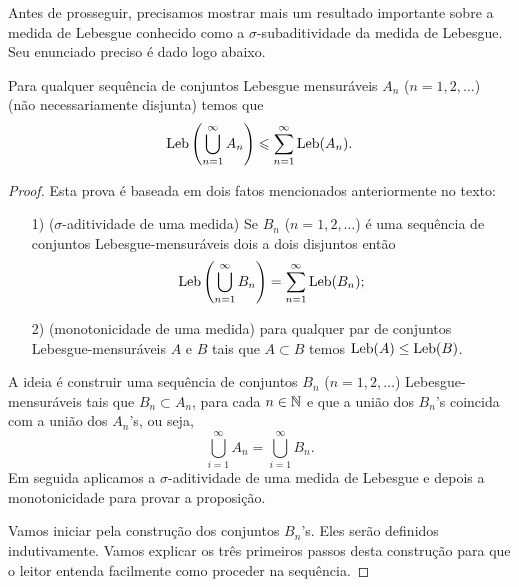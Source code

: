         Antes de prosseguir, precisamos mostrar mais um resultado
        importante sobre a medida de Lebesgue conhecido
        como a $\sigma$-subaditividade da medida de Lebesgue.
        Seu enunciado preciso é dado logo abaixo.
        \begin{proposicao}
        \label{prop-sub-sigma-aditividade-medida}
            Para qualquer sequência de conjuntos Lebesgue mensuráveis $A_n$ ($n=1,2,\ldots$)
            (não necessariamente disjunta) temos que
            \[
                \mathrm{Leb}\left( \bigcup_{n=1}^{\infty} A_n\right)
                \leqslant
                \sum_{n=1}^{\infty} \mathrm{Leb}(A_n).
            \]
        \end{proposicao}
        \begin{proof}
            Esta prova é baseada em dois fatos mencionados anteriormente no texto:
            \begin{itemize}
                \item[1)] ($\sigma$-aditividade de uma medida) 
                Se $B_n$ ($n=1,2,\ldots$) é uma sequência de conjuntos 
                Lebesgue-mensuráveis dois a dois disjuntos então 
                \[
                    \mathrm{Leb}\left( \bigcup_{n=1}^{\infty} B_n\right)
                    =
                    \sum_{n=1}^{\infty} \mathrm{Leb}(B_n);
                \]
                
                \item[2)] (monotonicidade de uma medida) para qualquer 
                par de conjuntos Lebesgue-mensuráveis $A$ e $B$ 
                tais que $A\subset B$ temos $\mathrm{Leb}(A)\leq \mathrm{Leb}(B)$. 
            \end{itemize}
            A ideia é construir uma sequência de conjuntos $B_n$ ($n=1,2,\ldots$) 
            Lebesgue-mensuráveis tais que $B_n\subset A_n$, para cada $n\in\mathbb{N}$
            e que a união dos $B_n$'s coincida com a união dos $A_n$'s, ou seja,
            \[
                \bigcup_{i=1}^{\infty} A_n = \bigcup_{i=1}^{\infty} B_n.
            \]
            Em seguida aplicamos a $\sigma$-aditividade de uma medida de Lebesgue
            e depois a monotonicidade para provar a proposição. 
        
            Vamos iniciar pela construção dos conjuntos $B_n$'s. 
            Eles serão definidos indutivamente. Vamos explicar os três 
            primeiros passos desta construção para que o leitor entenda facilmente
            como proceder na sequência. 
        

\end{proof}
